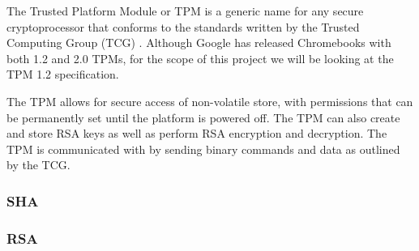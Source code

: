\documentclass[../report.tex]{subfiles}
\begin{document}
The Trusted Platform Module\cite{TPM} or TPM is a generic name for any secure cryptoprocessor that conforms to the standards written by the Trusted Computing Group (TCG) \cite{TCG}.
Although Google has released Chromebooks with both 1.2 and 2.0 TPMs, for the scope of this project we will be looking at the TPM 1.2 specification.

The TPM allows for secure access of non-volatile store, with permissions that can be permanently set until the platform is powered off.
The TPM can also create and store RSA keys as well as perform RSA encryption and decryption. 
The TPM is communicated with by sending binary commands and data as outlined by the TCG\cite{TPM}. 



\subsubsection{SHA}
\subsubsection{RSA}
\end{document}
